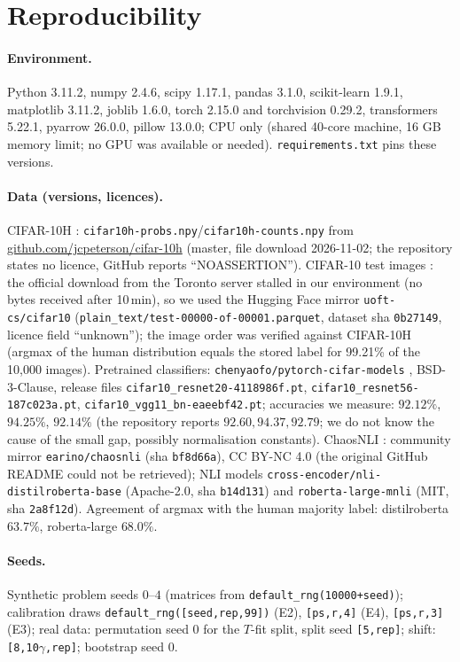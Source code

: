 \section{Reproducibility}\label{app:repro}
\paragraph{Environment.} Python 3.11.2, numpy 2.4.6, scipy 1.17.1, pandas 3.1.0, scikit-learn 1.9.1, matplotlib 3.11.2, joblib 1.6.0, torch 2.15.0 and torchvision 0.29.2, transformers 5.22.1, pyarrow 26.0.0, pillow 13.0.0; CPU only (shared 40-core machine, 16 GB memory limit; no GPU was available or needed). \texttt{requirements.txt} pins these versions.
\paragraph{Data (versions, licences).}
CIFAR-10H \citep{peterson2019}: \texttt{cifar10h-probs.npy}/\texttt{cifar10h-counts.npy} from \url{github.com/jcpeterson/cifar-10h} (master, file download 2026-11-02; the repository states no licence, GitHub reports ``NOASSERTION''). CIFAR-10 test images \citep{krizhevsky2009}: the official download from the Toronto server stalled in our environment (no bytes received after 10\,min), so we used the Hugging Face mirror \texttt{uoft-cs/cifar10} (\texttt{plain\_text/test-00000-of-00001.parquet}, dataset sha \texttt{0b27149}, licence field ``unknown''); the image order was verified against CIFAR-10H (argmax of the human distribution equals the stored label for 99.21\% of the 10{,}000 images). Pretrained classifiers: \texttt{chenyaofo/pytorch-cifar-models} \citep{chenyaofo}, BSD-3-Clause, release files \texttt{cifar10\_resnet20-4118986f.pt}, \texttt{cifar10\_resnet56-187c023a.pt}, \texttt{cifar10\_vgg11\_bn-eaeebf42.pt}; accuracies we measure: $92.12\%$, $94.25\%$, $92.14\%$ (the repository reports $92.60,94.37,92.79$; we do not know the cause of the small gap, possibly normalisation constants). ChaosNLI \citep{nie2020}: community mirror \texttt{earino/chaosnli} (sha \texttt{bf8d66a}), CC BY-NC 4.0 (the original GitHub README could not be retrieved); NLI models \texttt{cross-encoder/nli-distilroberta-base} (Apache-2.0, sha \texttt{b14d131}) and \texttt{roberta-large-mnli} (MIT, sha \texttt{2a8f12d}). Agreement of argmax with the human majority label: distilroberta $63.7\%$, roberta-large $68.0\%$.
\paragraph{Seeds.} Synthetic problem seeds $0$--$4$ (matrices from \texttt{default\_rng(10000+seed)}); calibration draws \texttt{default\_rng([seed,rep,99])} (E2), \texttt{[ps,r,4]} (E4), \texttt{[ps,r,3]} (E3); real data: permutation seed 0 for the $T$-fit split, split seed \texttt{[5,rep]}; shift: \texttt{[8,10$\gamma$,rep]}; bootstrap seed 0.
